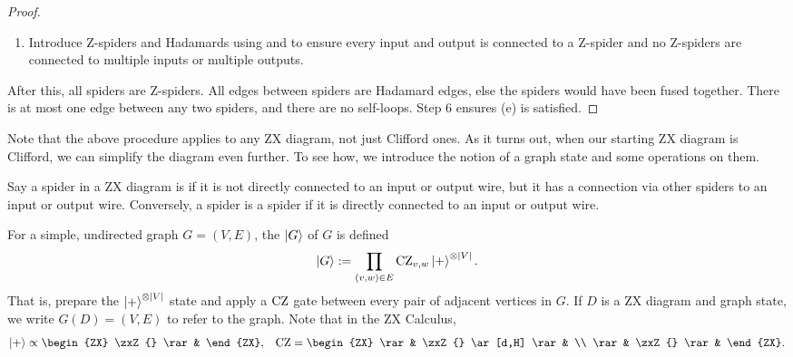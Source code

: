\begin{proof}
\begin{enumerate}
\begin{align}
    &\overset{\zxref{f}}{\propto}
    \begin{ZX}
        \leftManyDots{} \zxZ{\alpha+\pi} \zxLoopXPhase{\frac{\pi}{2}} \rightManyDots{} 
    \end{ZX}
    \overset{\substack{\zxref{f} \\ \zxref{hf}}}{\propto}
    \begin{ZX}
        \leftManyDots{} \zxZ{\alpha+\pi} \rightManyDots{} 
    \end{ZX}.
\end{align}
    \item Introduce Z-spiders and Hadamards using  and  to ensure every input and output is connected to a Z-spider and no Z-spiders are connected to multiple inputs or multiple outputs.
\end{enumerate}
After this, all spiders are Z-spiders. All edges between spiders are Hadamard edges, else the spiders would have been fused together. There is at most one edge between any two spiders, and there are no self-loops. Step 6 ensures (e) is satisfied.
\end{proof}

Note that the above procedure applies to any ZX diagram, not just Clifford ones. As it turns out, when our starting ZX diagram is Clifford, we can simplify the diagram even further. To see how, we introduce the notion of a graph state and some operations on them.

\begin{definition}
\label{def:internal-boundary-spiders}
Say a spider in a ZX diagram is  if it is not directly connected to an input or output wire, but it has a connection via other spiders to an input or output wire. Conversely, a spider is a  spider if it is directly connected to an input or output wire.
\end{definition}

\begin{definition}
\label{def:graph-state}
For a simple, undirected graph $G = (V,E)$, the  $\ket{G}$ of $G$ is defined
\begin{align}
    \ket{G} := \prod_{(v,w) \in E} \text{CZ}_{v,w} \ket{+}^{\otimes |V|}.
\end{align}
That is, prepare the $\ket{+}^{\otimes |V|}$ state and apply a $\text{CZ}$ gate between every pair of adjacent vertices in $G$. If $D$ is a ZX diagram and graph state, we write $G(D) = (V,E)$ to refer to the graph. Note that in the ZX Calculus, 
\begin{equation}
\begin{alignedat}{2}
    \ket{+} \propto \begin{ZX}
        \zxZ{} \rar &
    \end{ZX}, \quad
    &\CZ = \begin{ZX}
        \rar & \zxZ{} \ar[d,H] \rar & \\
        \rar & \zxZ{} \rar &
    \end{ZX}.
\end{alignedat}
\end{equation}
\end{definition}

